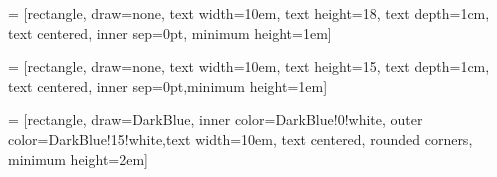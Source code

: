 



% 
 = [rectangle, draw=none, text width=10em, text
height=18, text depth=1cm, text centered, inner sep=0pt, minimum
height=1em]

 = [rectangle, draw=none, text width=10em, text
height=15, text depth=1cm, text centered, inner sep=0pt,minimum
height=1em]

 = [rectangle, draw=DarkBlue, inner
color=DarkBlue!0!white, outer color=DarkBlue!15!white,text width=10em, text centered,
rounded corners, minimum height=2em]


